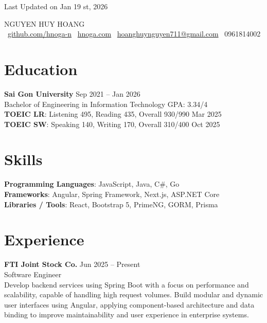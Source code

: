 \documentclass[letterpaper,11pt]{article}
\begin{document}
\begin{flushright}
\color{gray}
Last Updated on Jan 19 st, 2026
\end{flushright}

\vspace{-10pt}

\begin{center}
{\Huge \scshape NGUYEN HUY HOANG} \\[6pt]
\faGithub\ \href{https://github.com/hnoga-n}{github.com/hnoga-n}\quad
\faCode\ \href{https://hnoga-n.github.io/portfolio-hnoga/}{hnoga.com}\quad
\faEnvelope\ \href{mailto:hoanghuynguyen711@gmail.com}{hoanghuynguyen711@gmail.com}\quad
\faPhone\ 0961814002
\end{center}

\section{Education}
\textbf{Sai Gon University} \hfill Sep 2021 -- Jan 2026\\
Bachelor of Engineering in Information Technology \hfill GPA: 3.34/4\\
\vspace{6pt}
\textbf{TOEIC LR}: Listening 495, Reading 435, Overall 930/990 \hfill Mar 2025\\
\textbf{TOEIC SW}: Speaking 140, Writing 170, Overall 310/400 \hfill Oct 2025\\

\section{Skills}
\textbf{Programming Languages}: JavaScript, Java, C\#, Go\\
\textbf{Frameworks}: Angular, Spring Framework, Next.js, ASP.NET Core\\
\textbf{Libraries / Tools}: React, Bootstrap 5, PrimeNG, GORM, Prisma

\section{Experience}
\textbf{FTI Joint Stock Co.} \hfill Jun 2025 -- Present\\
Software Engineer\\
Develop backend services using Spring Boot with a focus on performance and scalability, capable of handling high request volumes. Build modular and dynamic user interfaces using Angular, applying component-based architecture and data binding to improve maintainability and user experience in enterprise systems.
\end{document}
